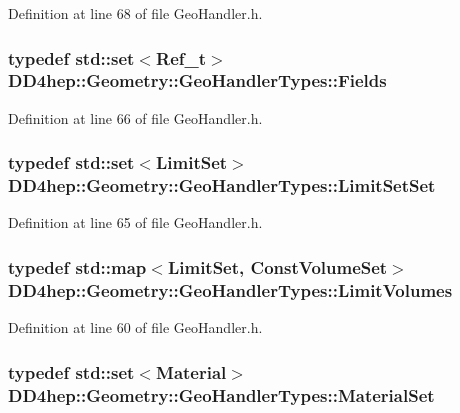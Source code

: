 Definition at line 68 of file GeoHandler.h.\hypertarget{class_d_d4hep_1_1_geometry_1_1_geo_handler_types_ac82df292e19cfb74015cb798e54620b4}{
\subsubsection[{Fields}]{\setlength{\rightskip}{0pt plus 5cm}typedef std::set$<${\bf Ref\_\-t}$>$ {\bf DD4hep::Geometry::GeoHandlerTypes::Fields}}}
\label{class_d_d4hep_1_1_geometry_1_1_geo_handler_types_ac82df292e19cfb74015cb798e54620b4}


Definition at line 66 of file GeoHandler.h.\hypertarget{class_d_d4hep_1_1_geometry_1_1_geo_handler_types_ae93bccfaccdbc36f0f5339c24aada447}{
\subsubsection[{LimitSetSet}]{\setlength{\rightskip}{0pt plus 5cm}typedef std::set$<${\bf LimitSet}$>$ {\bf DD4hep::Geometry::GeoHandlerTypes::LimitSetSet}}}
\label{class_d_d4hep_1_1_geometry_1_1_geo_handler_types_ae93bccfaccdbc36f0f5339c24aada447}


Definition at line 65 of file GeoHandler.h.\hypertarget{class_d_d4hep_1_1_geometry_1_1_geo_handler_types_ad8397c24589a1508baf0735bdb2b3c77}{
\subsubsection[{LimitVolumes}]{\setlength{\rightskip}{0pt plus 5cm}typedef std::map$<${\bf LimitSet}, {\bf ConstVolumeSet}$>$ {\bf DD4hep::Geometry::GeoHandlerTypes::LimitVolumes}}}
\label{class_d_d4hep_1_1_geometry_1_1_geo_handler_types_ad8397c24589a1508baf0735bdb2b3c77}


Definition at line 60 of file GeoHandler.h.\hypertarget{class_d_d4hep_1_1_geometry_1_1_geo_handler_types_a2cb3f04bc3529531d1559173eea5f7b5}{
\subsubsection[{MaterialSet}]{\setlength{\rightskip}{0pt plus 5cm}typedef std::set$<${\bf Material}$>$ {\bf DD4hep::Geometry::GeoHandlerTypes::MaterialSet}}}
\label{class_d_d4hep_1_1_geometry_1_1_geo_handler_types_a2cb3f04bc3529531d1559173eea5f7b5}


